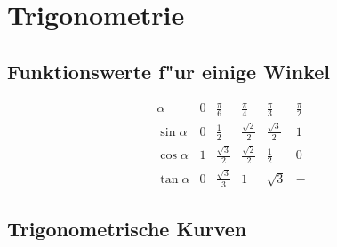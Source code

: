 \documentclass[german, 10pt, a4paper, headsepline]{scrreprt}
\theoremstyle{remark}
\begin{document}
\chapter{Trigonometrie}

\section{Funktionswerte f"ur einige Winkel}

\begin{displaymath}
\renewcommand{\arraystretch}{1.7}
\begin{array}{l||lllll}
 \alpha &		0 &		\frac{\pi}{6} &		\frac{\pi}{4} &		\frac{\pi}{3} &		\frac{\pi}{2}\\ \hline\hline
 \sin\alpha &		0 &		\frac{1}{2} &		\frac{\sqrt{2}}{2} &	\frac{\sqrt{3}}{2} &	1\\
 \cos\alpha &		1 &		\frac{\sqrt{3}}{2} & 	\frac{\sqrt{2}}{2} &	\frac{1}{2} &		0\\
 \tan\alpha &		0 &		\frac{\sqrt{3}}{3} &	1 &			\sqrt{3} &		-
\end{array}
\end{displaymath}


\section{Trigonometrische Kurven}
\end{document}
